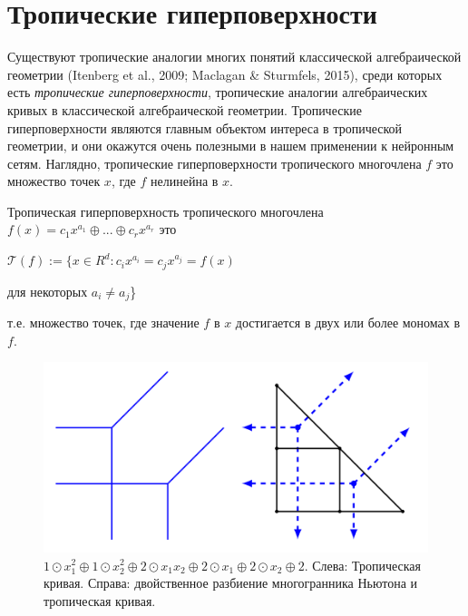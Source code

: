 \documentclass[russian]{lecture-notes}
\begin{document}
	\section{Тропические гиперповерхности}
	Существуют тропические аналогии многих понятий классической алгебраической геометрии (Itenberg et al., 2009; Maclagan \& Sturmfels, 2015), среди которых есть \textit{тропические гиперповерхности}, тропические аналогии алгебраических кривых в классической алгебраической геометрии. Тропические гиперповерхности являются главным объектом интереса в тропической геометрии, и они окажутся очень полезными в нашем применении к нейронным сетям. Наглядно, тропические гиперповерхности тропического многочлена $f$ это множество точек $x$, где $f$ нелинейна в $x$.
	
	\begin{Definition}
		Тропическая гиперповерхность тропического многочлена $f(x) = c_1x^{a_1} \oplus ... \oplus c_rx^{a_r}$ это
		\begin{center}
			$\mathcal{T}(f) := \{x \in R^d : c_ix^{a_i} = c_jx^{a_j} = f(x)$ 
		\end{center}
		\begin{flushright}
			для некоторых $a_i \neq a_j$\}
		\end{flushright}
		т.е. множество точек, где значение $f$ в $x$ достигается в двух или более мономах в $f$.
	\end{Definition}
	
	\begin{figure}[h]
		\centering
		\includegraphics{tropical_curve.png}
		\caption{$1 \odot x_1^2 \oplus 1 \odot x_2^2 \oplus 2 \odot x_1x_2 \oplus 2 \odot x_1 \oplus 2 \odot x_2 \oplus 2.$ Слева: Тропическая кривая. Справа: двойственное разбиение многогранника Ньютона и тропическая кривая.}
	\end{figure}
	
\end{document}

